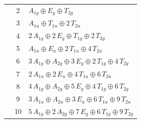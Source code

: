 \documentclass[11pt]{article}
\begin{document}
\begin{longtable}{l c p{}}
 & 2 & $A_{1g}\oplus E_{g}\oplus T_{2g}$\\
 & 3 & $A_{1u}\oplus T_{1u}\oplus 2\,T_{2u}$\\
 & 4 & $2\,A_{1g}\oplus 2\,E_{g}\oplus T_{1g}\oplus 2\,T_{2g}$\\
 & 5 & $A_{1u}\oplus E_{u}\oplus 2\,T_{1u}\oplus 4\,T_{2u}$\\
 & 6 & $3\,A_{1g}\oplus A_{2g}\oplus 3\,E_{g}\oplus 2\,T_{1g}\oplus 4\,T_{2g}$\\
 & 7 & $2\,A_{1u}\oplus 2\,E_{u}\oplus 4\,T_{1u}\oplus 6\,T_{2u}$\\
 & 8 & $4\,A_{1g}\oplus A_{2g}\oplus 5\,E_{g}\oplus 4\,T_{1g}\oplus 6\,T_{2g}$\\
 & 9 & $3\,A_{1u}\oplus A_{2u}\oplus 3\,E_{u}\oplus 6\,T_{1u}\oplus 9\,T_{2u}$\\
 & 10 & $5\,A_{1g}\oplus 2\,A_{2g}\oplus 7\,E_{g}\oplus 6\,T_{1g}\oplus 9\,T_{2g}$\\
\hline
\end{longtable}
\end{document}
